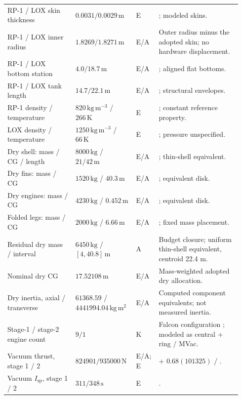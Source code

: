 \begin{longtable}{@{}>{\raggedright\arraybackslash}p{0.29\linewidth}>{\raggedright\arraybackslash}p{0.25\linewidth}>{\raggedright\arraybackslash}p{0.06\linewidth}>{\raggedright\arraybackslash}p{0.34\linewidth}@{}}
RP-1 / LOX skin thickness & $0.0031/0.0029\,\mathrm{m}$ & E & \cite[Table 1]{ecker2017}; modeled skins. \\
RP-1 / LOX inner radius & $1.8269/1.8271\,\mathrm{m}$ & E/A & Outer radius minus the adopted skin; no hardware displacement. \\
RP-1 / LOX bottom station & $4.0/18.7\,\mathrm{m}$ & E/A & \cite[Table 1]{ecker2017}; aligned flat bottoms. \\
RP-1 / LOX tank length & $14.7/22.1\,\mathrm{m}$ & E/A & \cite[Table 1]{ecker2017}; structural envelopes. \\
RP-1 density / temperature & $820\,\mathrm{kg\,m^{-3}}$ / $266\,\mathrm{K}$ & E & \cite[Table 5]{miquel2020}; constant reference property. \\
LOX density / temperature & $1250\,\mathrm{kg\,m^{-3}}$ / $66\,\mathrm{K}$ & E & \cite[Table 5]{miquel2020}; pressure unspecified. \\
Dry shell: mass / CG / length & $8000\,\mathrm{kg}$ / $21/42\,\mathrm{m}$ & E/A & \cite[Table 2]{bykerk2023}; thin-shell equivalent. \\
Dry fins: mass / CG & $1520\,\mathrm{kg}$ / $40.3\,\mathrm{m}$ & E/A & \cite[Table 2]{bykerk2023}; equivalent disk. \\
Dry engines: mass / CG & $4230\,\mathrm{kg}$ / $0.452\,\mathrm{m}$ & E/A & \cite[Table 2]{bykerk2023}; equivalent disk. \\
Folded legs: mass / CG & $2000\,\mathrm{kg}$ / $6.66\,\mathrm{m}$ & E/A & \cite[Table 2]{bykerk2023}; fixed mass placement. \\
Residual dry mass / interval & $6450\,\mathrm{kg}$ / $[4,40.8]\,\mathrm{m}$ & A & Budget closure; uniform thin-shell equivalent, centroid 22.4 m. \\
Nominal dry CG & $17.52108\,\mathrm{m}$ & E/A & Mass-weighted adopted dry allocation. \\
Dry inertia, axial / transverse & $61368.59$ / $4441994.04\,\mathrm{kg\,m^2}$ & E/A & Computed component equivalents; not measured inertia. \\
Stage-1 / stage-2 engine count & $9/1$ & K & Falcon configuration \cite{spacex2015}; modeled as central + ring / MVac. \\
Vacuum thrust, stage 1 / 2 & $824901/935000\,\mathrm{N}$ & E/A; E & 756000 + $0.68(101325)$ / \cite[Table 2.16]{pezent2024}. \\
Vacuum $I_{\mathrm{sp}}$, stage 1 / 2 & $311/348\,\mathrm{s}$ & E & \cite[Table 2.16]{pezent2024}. \\

\end{longtable}
